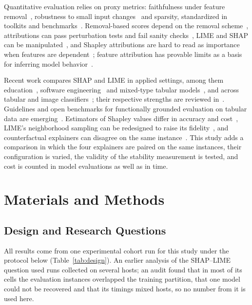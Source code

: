 \documentclass[11pt,a4paper]{article}
\begin{document}
Quantitative evaluation relies on proxy metrics: faithfulness under feature
removal~\cite{bhatt2020evaluating,samek2017evaluating},
robustness to small input changes~\cite{alvarezmelis2018robustness} and
sparsity, standardized in toolkits and
benchmarks~\cite{hedstrom2023quantus,agarwal2022openxai}. Removal-based
scores depend on the removal scheme~\cite{zheng2025ffidelity}, attributions
can pass perturbation tests and fail sanity checks~\cite{adebayo2018sanity}, LIME and SHAP can be manipulated~\cite{baniecki2024adversarial},
and Shapley attributions are hard to read as importance when features are
dependent~\cite{huang2024failings}; feature attribution has
provable limits as a basis for inferring model
behavior~\cite{bilodeau2024impossibility}.

Recent work compares SHAP and LIME in applied settings, among them
education~\cite{hooshyar2024problems}, software
engineering~\cite{schulte2024studying} and mixed-type tabular
models~\cite{lazar2026beyond}, and across tabular and image
classifiers~\cite{ababneh2026faithfulness}; their respective strengths are
reviewed in~\cite{salih2025perspective,mersha2024survey}. Guidelines and
open benchmarks for functionally grounded evaluation on tabular data are
emerging~\cite{velmurugan2025guidelines,moiseev2025benchmark}. Estimators of
Shapley values differ in accuracy and
cost~\cite{olsen2024comparative}, LIME's neighborhood sampling can be
redesigned to raise its fidelity~\cite{saadatfar2024uslime}, and
counterfactual explainers can disagree on the same
instance~\cite{brughmans2024disagreement}. This study adds a comparison in
which the four explainers are paired on the same instances, their
configuration is varied, the validity of the stability measurement is
tested, and cost is counted in model evaluations as well as in time.

\section{Materials and Methods}
\label{sec:methods}

\subsection{Design and Research Questions}
\label{sec:rqs}

All results come from one experimental cohort run for this study under the
protocol below (Table~\ref{tab:design}). An earlier analysis of the
SHAP--LIME question used runs collected on several hosts; an audit found that
in most of its cells the evaluation instances overlapped the training
partition, that one model could not be recovered and that its timings mixed
hosts, so no number from it is used here.
\end{document}
